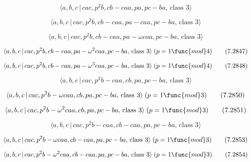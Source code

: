 \documentclass[10pt]{article}
\begin{document}
\begin{equation}
\langle a,b,c\,|\,cac,p^2b,cb-caa,pa,pc-ba,\,\text{class }3\rangle 
\tag{7.2844}
\end{equation}

\begin{equation}
\langle a,b,c\,|\,cac,p^2b,cb-caa,pa-caa,pc-ba,\,\text{class }3\rangle 
\tag{7.2845}
\end{equation}

\begin{equation}
\langle a,b,c\,|\,cac,p^{2}b,cb-caa,pa-\omega caa,pc-ba,\,\text{class }%
3\rangle  \tag{7.2846}
\end{equation}

\begin{equation}
\langle a,b,c\,|\,cac,p^{2}b,cb-caa,pa-\omega ^{2}caa,pc-ba,\,\text{class }%
3\rangle \;(p=1\func{mod}4)  \tag{7.2847}
\end{equation}

\begin{equation}
\langle a,b,c\,|\,cac,p^{2}b,cb-caa,pa-\omega ^{3}caa,pc-ba,\,\text{class }%
3\rangle \;(p=1\func{mod}4)  \tag{7.2848}
\end{equation}

\begin{equation}
\langle a,b,c\,|\,cac,p^2b-caa,cb,pa,pc-ba,\,\text{class }3\rangle 
\tag{7.2849}
\end{equation}

\begin{equation}
\langle a,b,c\,|\,cac,p^{2}b-\omega caa,cb,pa,pc-ba,\,\text{class }3\rangle
\;(p=1\func{mod}3)  \tag{7.2850}
\end{equation}

\begin{equation}
\langle a,b,c\,|\,cac,p^{2}b-\omega ^{2}caa,cb,pa,pc-ba,\,\text{class }%
3\rangle \;(p=1\func{mod}3)  \tag{7.2851}
\end{equation}

\begin{equation}
\langle a,b,c\,|\,cac,p^2b-caa,cb-caa,pa,pc-ba,\,\text{class }3\rangle 
\tag{7.2852}
\end{equation}

\begin{equation}
\langle a,b,c\,|\,cac,p^{2}b-\omega caa,cb-caa,pa,pc-ba,\,\text{class }%
3\rangle \;(p=1\func{mod}3)  \tag{7.2853}
\end{equation}

\begin{equation}
\langle a,b,c\,|\,cac,p^{2}b-\omega ^{2}caa,cb-caa,pa,pc-ba,\,\text{class }%
3\rangle \;(p=1\func{mod}3)  \tag{7.2854}
\end{equation}
\end{document}
